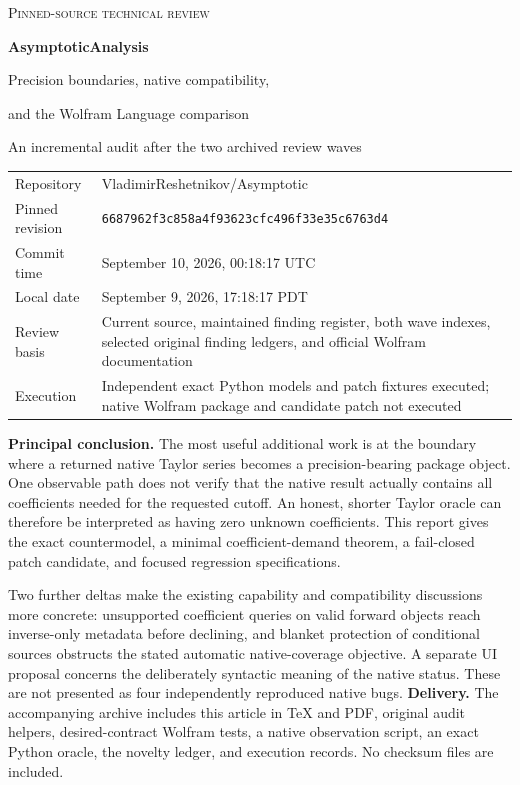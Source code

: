 \documentclass[11pt,letterpaper]{article}
\newcommand{\rev}{\texttt{6687962f3c858a4f93623cfc496f33e35c6763d4}}
\theoremstyle{definition}\newtheorem{definition}[proposition]{Definition}
\begin{document}
\begin{titlepage}
\vspace*{0.45in}
{\color{ink}\Large\textsc{Pinned-source technical review}\par}
\vspace{0.22in}
{\color{ink}\huge\bfseries AsymptoticAnalysis\par}
\vspace{0.14in}
{\LARGE Precision boundaries, native compatibility,\par
and the Wolfram Language comparison\par}
\vspace{0.3in}
{\large An incremental audit after the two archived review waves\par}
\vspace{0.4in}
\begin{tabularx}{\linewidth}{@{}p{1.3in}Y@{}}
\toprule
Repository & VladimirReshetnikov/Asymptotic\\
Pinned revision & \rev\\
Commit time & September 10, 2026, 00:18:17 UTC\\
Local date & September 9, 2026, 17:18:17 PDT\\
Review basis & Current source, maintained finding register, both wave indexes, selected original finding ledgers, and official Wolfram documentation\\
Execution & Independent exact Python models and patch fixtures executed; native Wolfram package and candidate patch not executed\\
\bottomrule
\end{tabularx}

\vspace{0.32in}
\textbf{Principal conclusion.} The most useful additional work is at the boundary
where a returned native Taylor series becomes a precision-bearing package
object. One observable path does not verify that the native result actually
contains all coefficients needed for the requested cutoff. An honest, shorter
Taylor oracle can therefore be interpreted as having zero unknown coefficients.
This report gives the exact countermodel, a minimal coefficient-demand theorem,
a fail-closed patch candidate, and focused regression specifications.

Two further deltas make the existing capability and compatibility discussions
more concrete: unsupported coefficient queries on valid forward objects reach
inverse-only metadata before declining, and blanket protection of conditional
sources obstructs the stated automatic native-coverage objective. A separate
UI proposal concerns the deliberately syntactic meaning of the native
 status. These are not presented as four independently reproduced
native bugs.
\vfill
\textbf{Delivery.} The accompanying archive includes this article in TeX and PDF,
original audit helpers, desired-contract Wolfram tests, a native observation
script, an exact Python oracle, the novelty ledger, and execution records.
No checksum files are included.
\end{titlepage}
\end{document}
